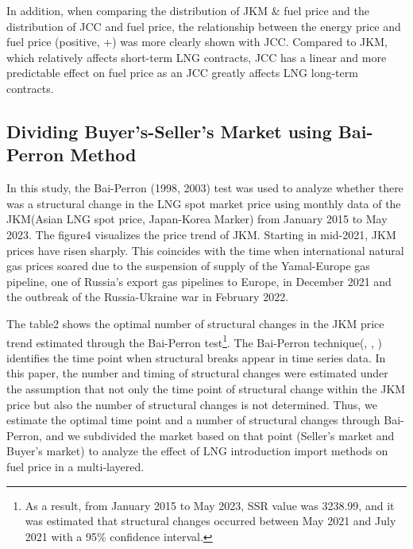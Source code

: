 \documentclass[12pt]{article}
\begin{document}
In addition, when comparing the distribution of JKM \& fuel price and the distribution of JCC and fuel price, the relationship between the energy price and fuel price (positive, +) was more clearly shown with JCC. Compared to JKM, which relatively affects short-term LNG contracts, JCC has a linear and more predictable effect on fuel price as an JCC greatly affects LNG long-term contracts.



\subsection{Dividing Buyer's-Seller's Market using Bai-Perron Method}

In this study, the Bai-Perron (1998, 2003) test was used to analyze whether there was a structural change in the LNG spot market price using monthly data of the JKM(Asian LNG spot price, Japan-Korea Marker) from January 2015 to May 2023. The figure4 visualizes the price trend of JKM. Starting in mid-2021, JKM prices have risen sharply. This coincides with the time when international natural gas prices soared due to the suspension of supply of the Yamal-Europe gas pipeline, one of Russia's export gas pipelines to Europe, in December 2021 and the outbreak of the Russia-Ukraine war in February 2022.







The table2 shows the optimal number of structural changes in the JKM price trend estimated through the Bai-Perron test\footnote{As a result, from January 2015 to May 2023, SSR value was 3238.99, and it was estimated that structural changes occurred between May 2021 and July 2021 with a 95\% confidence interval.}. The Bai-Perron technique(\cite{bai1998estimating}, \cite{bai2003computation}, \cite{bai2003critical}) identifies the time point when structural breaks appear in time series data. In this paper, the number and timing of structural changes were estimated under the assumption that not only the time point of structural change within the JKM price but also the number of structural changes is not determined. Thus, we estimate the optimal time point and a number of structural changes through Bai-Perron, and we subdivided the market based on that point (Seller's market and Buyer's market) to analyze the effect of LNG introduction import methods on fuel price in a multi-layered. 
\end{document}
